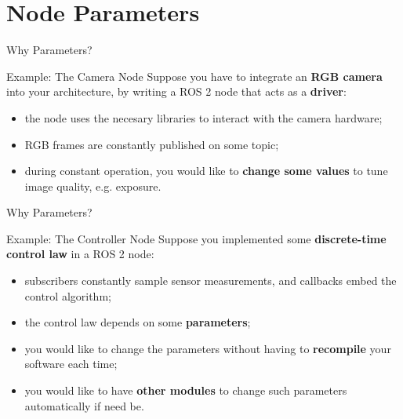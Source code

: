 
\section{Node Parameters}

\begin{frame}{Why Parameters?}
\begin{exampleblock}{Example: The Camera Node}
  Suppose you have to integrate an \textbf{RGB camera} into your architecture, by writing a ROS 2 node that acts as a \textbf{driver}:
  \begin{itemize}
    \item the node uses the necesary libraries to interact with the camera hardware;
    \item RGB frames are constantly published on some topic;
    \item during constant operation, you would like to \textbf{change some values} to tune image quality, e.g. exposure.
  \end{itemize}
\end{exampleblock}
\end{frame}
\begin{frame}{Why Parameters?}
\begin{exampleblock}{Example: The Controller Node}
  Suppose you implemented some \textbf{discrete-time control law} in a ROS 2 node:
  \begin{itemize}
    \item subscribers constantly sample sensor measurements, and callbacks embed the control algorithm;
    \item the control law depends on some \textbf{parameters};
    \item you would like to change the parameters without having to \textbf{recompile} your software each time;
    \item you would like to have \textbf{other modules} to change such parameters automatically if need be.
  \end{itemize}
\end{exampleblock}
\end{frame}

